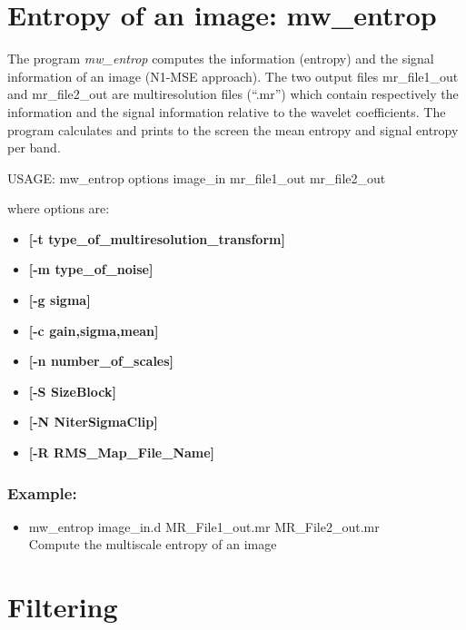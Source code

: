 \section{Entropy of an image: mw\_entrop}
The program 
{\em mw\_entrop} computes the information (entropy) and the signal information
of an image (N1-MSE approach). The two output files mr\_file1\_out and mr\_file2\_out 
are multiresolution files (``.mr'') which contain respectively 
the information and the signal information 
relative to the wavelet coefficients. The program calculates and prints to
the screen the mean entropy and signal entropy per band.
{\bf 
\begin{center}
 USAGE: mw\_entrop options image\_in  mr\_file1\_out mr\_file2\_out
\end{center}}
where options are:
\begin{itemize}
\baselineskip=0.4truecm
\itemsep=0.1truecm
\item {\bf [-t type\_of\_multiresolution\_transform]} 
\item {\bf [-m type\_of\_noise]}
\item {\bf [-g sigma]}
\item {\bf [-c gain,sigma,mean]}
\item {\bf [-n number\_of\_scales]}
\item {\bf [-S SizeBlock]} 
\item {\bf [-N NiterSigmaClip]}
\item {\bf [-R RMS\_Map\_File\_Name]}
\end{itemize}
\subsubsection*{Example:}
\begin{itemize}
\item mw\_entrop image\_in.d MR\_File1\_out.mr MR\_File2\_out.mr \\
Compute the multiscale entropy of an image
\end{itemize}

\section{Filtering}
